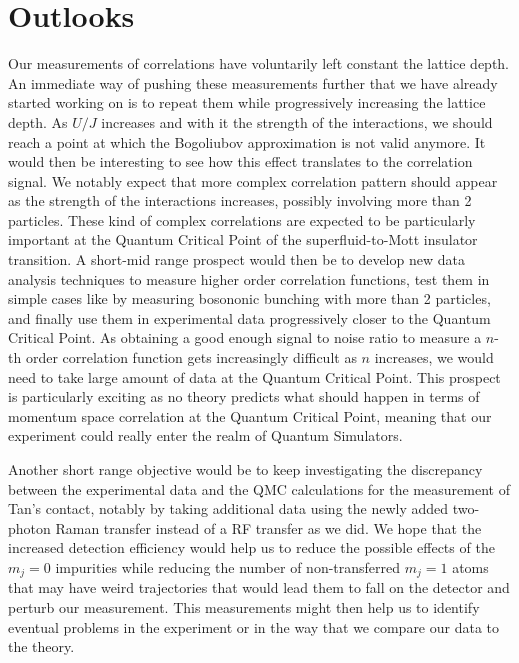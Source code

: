 \section*{Outlooks}


Our measurements of \kmk correlations have voluntarily left constant the lattice depth. An immediate way of pushing these measurements further that we have already started working on is to repeat them while progressively increasing the lattice depth. As $U/J$ increases and with it the strength of the interactions, we should reach a point at which the Bogoliubov approximation is not valid anymore. It would then be interesting to see how this effect translates to the \kmk correlation signal. We notably expect that more complex correlation pattern should appear as the strength of the interactions increases, possibly involving more than 2 particles. These kind of complex correlations are expected to be particularly important at the Quantum Critical Point of the superfluid-to-Mott insulator transition. A short-mid range prospect would then be to develop new data analysis techniques to measure higher order correlation functions, test them in simple cases like by measuring bosononic bunching with more than 2 particles, and finally use them in experimental data progressively closer to the Quantum Critical Point. As obtaining a good enough signal to noise ratio to measure a $n$-th order correlation function gets increasingly difficult as $n$ increases, we would need to take large amount of data at the Quantum Critical Point. This prospect is particularly exciting as no theory predicts what should happen in terms of momentum space correlation at the Quantum Critical Point, meaning that our experiment could really enter the realm of Quantum Simulators. 

Another short range objective would be to keep investigating the discrepancy between the experimental data and the QMC calculations for the measurement of Tan's contact, notably by taking additional data using the newly added two-photon Raman transfer instead of a RF transfer as we did. We hope that the increased detection efficiency would help us to reduce the possible effects of the $m_j=0$ impurities while reducing the number of non-transferred $m_j=1$ atoms that may have weird trajectories that would lead them to fall on the detector and perturb our measurement. This measurements might then help us to identify eventual problems in the experiment or in the way that we compare our data to the theory.

